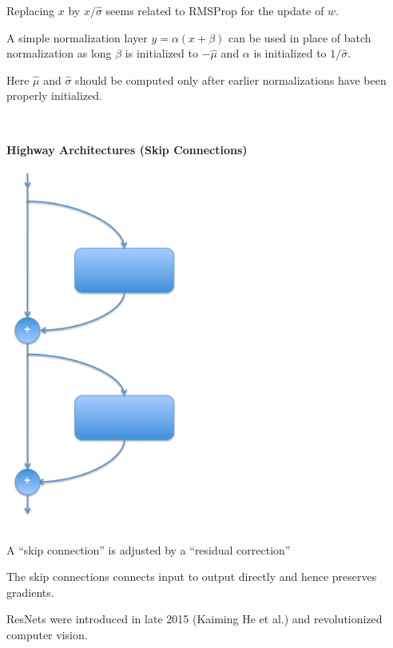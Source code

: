 {{\vfill
Replacing $x$ by $x/\hat{\sigma}$ seems related to RMSProp for the update of $w$.


A simple normalization layer $y = \alpha (x + \beta)$ can be used in place of batch normalization as long $\beta$ is initialized to $-\hat{\mu}$
and $\alpha$ is initialized to $1/\hat{\sigma}$.

\vfill
Here $\hat{\mu}$ and $\hat{\sigma}$ should be computed only after earlier normalizations have been properly initialized.
}

\vfill
\eject
~ \vfill
\centerline{\bf Highway Architectures (Skip Connections)}
\vfill
\vfill


\vfill
\includegraphics[width= 2.5in]{../images/resnet}
\hfill \begin{minipage}[b]{4in}
  A ``skip connection'' is adjusted by a ``residual correction''

  \bigskip
  The skip connections connects input to output directly and hence preserves gradients.

  \bigskip
  ResNets were introduced in late 2015 (Kaiming He et al.) and revolutionized computer vision.
\end{minipage}


}
